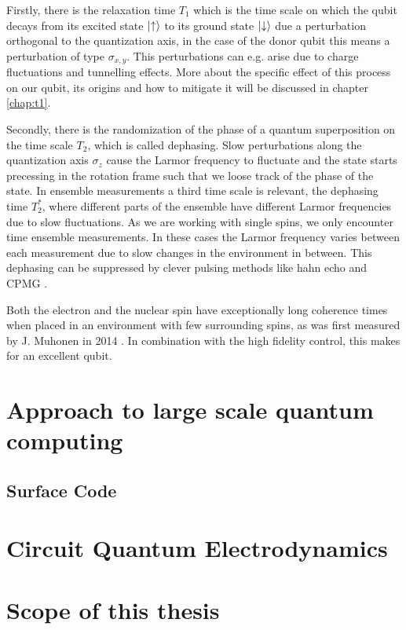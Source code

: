 Firstly, there is the relaxation time $T_1$ which is the time scale on which the qubit decays from its excited state $\ket{\uparrow}$ to its ground state $\ket{\downarrow}$ due a perturbation orthogonal to the quantization axis, in the case of the donor qubit this means a perturbation of type $\sigma_{x,y}$. This perturbations can e.g. arise due to charge fluctuations and tunnelling effects. More about the specific effect of this process on our qubit, its origins and how to mitigate it will be discussed in chapter \ref{chap:t1}. 

Secondly, there is the randomization of the phase of a quantum superposition on the time scale $T_2$, which is called dephasing. Slow perturbations along the quantization axis $\sigma_z$ cause the Larmor frequency to fluctuate and the state starts precessing in the rotation frame such that we loose track of the phase of the state. 
In ensemble measurements a third time scale is relevant, the dephasing time $T_2^*$, where different parts of the ensemble have different Larmor frequencies due to slow fluctuations. As we are working with single spins, we only encounter time ensemble measurements. In these cases the Larmor frequency varies between each measurement due to slow changes in the environment in between. This dephasing can be suppressed by clever pulsing methods like hahn echo and CPMG \cite{CPMG}. 

Both the electron and the nuclear spin have exceptionally long coherence times when placed in an environment with few surrounding spins, as was first measured by J. Muhonen in 2014 \cite{Muhonen2014}. In combination with the high fidelity control, this makes for an excellent qubit.  



\section{Approach to large scale quantum computing} \label{sec:scaleup}

\subsection{Surface Code}

\section{Circuit Quantum Electrodynamics}

\section{Scope of this thesis}


